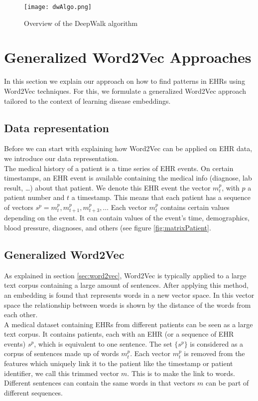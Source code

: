 \begin{figure}[!htb]
	\centering
	\texttt{[image: dwAlgo.png]}
	\caption{Overview of the DeepWalk algorithm \cite{deepwalkMain:article}}
	\label{fig:dwAlgo}
\end{figure} 

\section{Generalized Word2Vec Approaches}
\label{sec:gw2v}

In this section we explain our approach on how to find patterns in EHRs using Word2Vec techniques. For this, we formulate a generalized Word2Vec approach tailored to the context of learning disease embeddings.

\subsection{Data representation}

Before we can start with explaining how Word2Vec can be applied on EHR data, we introduce our data representation. \\
The medical history of a patient is a time series of EHR events. On certain timestamps, an EHR event is available containing the medical info (diagnose, lab result, \ldots) about that patient. We denote this EHR event the vector $m^p_t$, with $p$ a patient number and $t$ a timestamp. This means that each patient has a sequence of vectors $s^p = m^p_t, m^p_{t+1}, m^p_{t+3}, \ldots$ Each vector $m^p_t$ contains certain values depending on the event. It can contain values of the event's time, demographics, blood pressure, diagnoses, and others (see figure \ref{fig:matrixPatient}. 

\subsection{Generalized Word2Vec}

As explained in section \ref{sec:word2vec}, Word2Vec is typically applied to a large text corpus containing a large amount of sentences. After applying this method, an embedding is found that represents words in a new vector space. In this vector space the relationship between words is shown by the distance of the words from each other. \\

A medical dataset containing EHRs from different patients can be seen as a large text corpus. It contains patients, each with an EHR (or a sequence of EHR events) $s^p$, which is equivalent to one sentence. The set $\{s^p\}$ is considered as a corpus of sentences made up of words $m^p_t$. Each vector $m^p_t$ is removed from the features which uniquely link it to the patient like the timestamp or patient identifier, we call this trimmed vector $m$. This is to make the link to words. Different sentences can contain the same words in that vectors $m$ can be part of different sequences. \\

